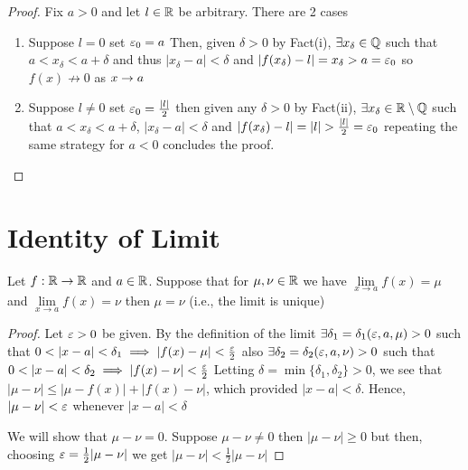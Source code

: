 \begin{proof}
    Fix $a > 0$ and let $l \in \mathbb R$ be arbitrary. There are 2 cases
    \begin{enumerate}
        \item Suppose $l = 0$ set $\varepsilon_0 = a$
        Then, given $\delta > 0$ by Fact(i), $\exists x_\delta \in \mathbb Q$ such that $a < x_\delta < a + \delta$ and thus
        $|x_\delta - a| < \delta$ and $|f(x_\delta)-l| = x_\delta > a = \varepsilon_0$
        so $f(x)\nrightarrow 0$ as $x \rightarrow a$
        \item Suppose $l \neq 0$ set $\varepsilon_0=\frac{|l|}{2}$
        then given any $\delta > 0$ by Fact(ii), $\exists x_\delta\in \mathbb R\setminus \mathbb Q$ such that $a < x_\delta < a + \delta$, $|x_\delta - a| < \delta$ and $|f(x_\delta)-l| = |l| > \frac{|l|}{2} = \varepsilon_0$
        repeating the same strategy for $a < 0$ concludes the proof.
    \end{enumerate}
\end{proof}

\section{Identity of Limit}
\begin{theorem}
    Let $f:\mathbb R \rightarrow \mathbb R$ and $a \in \mathbb R$.
    Suppose that for $\mu, \nu \in \mathbb R$ we have $\lim\limits_{x \to a} f(x) = \mu$ and $\lim\limits_{x \to a} f(x) = \nu$ then $\mu = \nu$
    (i.e., the limit is unique)
\end{theorem}
\begin{proof}
    Let $\varepsilon > 0$ be given. 
    By the definition of the limit $\exists \delta_1 = \delta_1(\varepsilon, a, \mu) > 0$ such that 
    $0 < |x - a| < \delta_1 \implies |f(x) - \mu| < \frac{\varepsilon}{2}$
    also $\exists \delta_2 = \delta_2(\varepsilon, a, \nu) > 0$ such that 
    $0 < |x - a| < \delta_2 \implies |f(x) - \nu| < \frac{\varepsilon}{2}$
    Letting $\delta = \min\{\delta_1, \delta_2\} > 0$,
    we see that $|\mu - \nu| \leq |\mu - f(x)| + |f(x) - \nu|$, which provided $|x-a|<\delta$.
    Hence, $|\mu-\nu| < \varepsilon$ whenever $|x-a|<\delta$

    We will show that $\mu-\nu = 0$. Suppose $\mu-\nu \neq 0$ then $|\mu-\nu| \geq 0$ but then, choosing $\varepsilon=\frac{1}{2}|\mu-\nu|$ we get $|\mu-\nu| < \frac{1}{2}|\mu-\nu|$
    
\end{proof}


